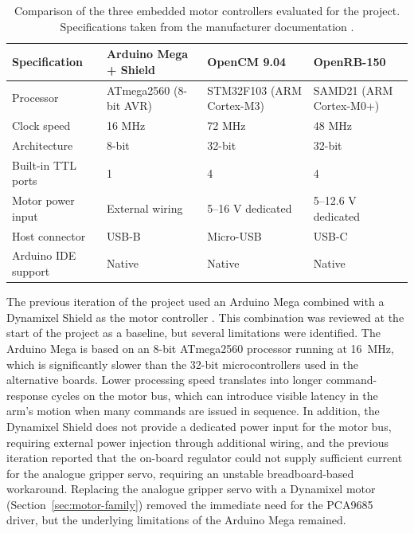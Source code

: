 \begin{table}[H]
    \centering
    \renewcommand{\arraystretch}{1.3}
    \begin{tabular}{|p{3.3cm}|p{3.3cm}|p{3.3cm}|p{3.3cm}|}
        \hline
        \textbf{Specification} & \textbf{Arduino Mega + Shield} & 
        \textbf{OpenCM 9.04} & \textbf{OpenRB-150} \\
        \hline
        Processor & ATmega2560 (8-bit AVR) & STM32F103 (ARM Cortex-M3) & 
        SAMD21 (ARM Cortex-M0+) \\
        \hline
        Clock speed & 16 MHz & 72 MHz & 48 MHz \\
        \hline
        Architecture & 8-bit & 32-bit & 32-bit \\
        \hline
        Built-in TTL ports & 1 & 4 & 4 \\
        \hline
        Motor power input & External wiring & 5--16 V dedicated & 
        5--12.6 V dedicated \\
        \hline
        Host connector & USB-B & Micro-USB & USB-C \\
        \hline
        Arduino IDE support & Native & Native & Native \\
        \hline
    \end{tabular}
    \caption{Comparison of the three embedded motor controllers 
    evaluated for the project. Specifications taken from the 
    manufacturer documentation \cite{robotis_dynamixel}.}
    \label{tab:controller_comparison}
\end{table}

The previous iteration of the project used an Arduino Mega 
combined with a Dynamixel Shield as the motor controller 
\cite{sortify}. This combination was reviewed at the start of 
the project as a baseline, but several limitations were 
identified. The Arduino Mega is based on an 8-bit ATmega2560 
processor running at 16~MHz, which is significantly slower than 
the 32-bit microcontrollers used in the alternative boards. 
Lower processing speed translates into longer command-response 
cycles on the motor bus, which can introduce visible latency in 
the arm's motion when many commands are issued in sequence. In 
addition, the Dynamixel Shield does not provide a dedicated 
power input for the motor bus, requiring external power injection 
through additional wiring, and the previous iteration reported 
that the on-board regulator could not supply sufficient current 
for the analogue gripper servo, requiring an unstable 
breadboard-based workaround. Replacing the analogue gripper
servo with a Dynamixel motor (Section~\ref{sec:motor-family}) removed the immediate
need for the PCA9685 driver, but the underlying limitations of
the Arduino Mega remained.

